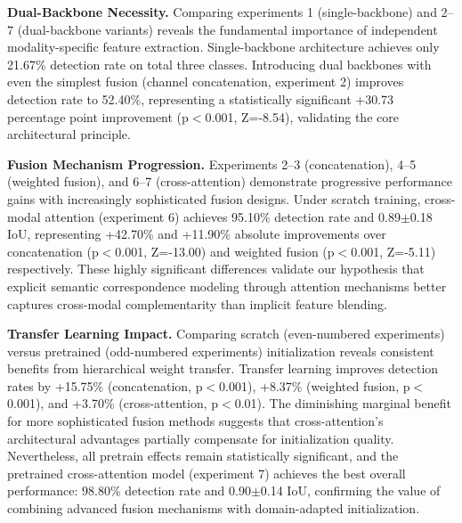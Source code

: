 \documentclass[journal,twoside,web]{ieeecolor}
\begin{document}
\textbf{Dual-Backbone Necessity.} Comparing experiments 1 (single-backbone) and 2--7 (dual-backbone variants) reveals the fundamental importance of independent modality-specific feature extraction. Single-backbone architecture achieves only 21.67\% detection rate on total three classes. Introducing dual backbones with even the simplest fusion (channel concatenation, experiment 2) improves detection rate to 52.40\%, representing a statistically significant +30.73 percentage point improvement (p$<$0.001, Z=-8.54), validating the core architectural principle.

\textbf{Fusion Mechanism Progression.} Experiments 2--3 (concatenation), 4--5 (weighted fusion), and 6--7 (cross-attention) demonstrate progressive performance gains with increasingly sophisticated fusion designs. Under scratch training, cross-modal attention (experiment 6) achieves 95.10\% detection rate and 0.89$\pm$0.18 IoU, representing +42.70\% and +11.90\% absolute improvements over concatenation (p$<$0.001, Z=-13.00) and weighted fusion (p$<$0.001, Z=-5.11) respectively. These highly significant differences validate our hypothesis that explicit semantic correspondence modeling through attention mechanisms better captures cross-modal complementarity than implicit feature blending.

\textbf{Transfer Learning Impact.} Comparing scratch (even-numbered experiments) versus pretrained (odd-numbered experiments) initialization reveals consistent benefits from hierarchical weight transfer. Transfer learning improves detection rates by +15.75\% (concatenation, p$<$0.001), +8.37\% (weighted fusion, p$<$0.001), and +3.70\% (cross-attention, p$<$0.01). The diminishing marginal benefit for more sophisticated fusion methods suggests that cross-attention's architectural advantages partially compensate for initialization quality. Nevertheless, all pretrain effects remain statistically significant, and the pretrained cross-attention model (experiment 7) achieves the best overall performance: 98.80\% detection rate and 0.90$\pm$0.14 IoU, confirming the value of combining advanced fusion mechanisms with domain-adapted initialization.
\end{document}
